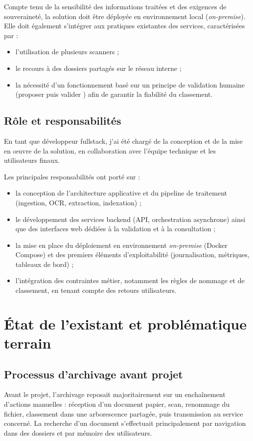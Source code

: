 \documentclass[12pt,a4paper]{report}
\begin{document}
Compte tenu de la sensibilité des informations traitées et des exigences de souveraineté, la solution doit être déployée en environnement local (\textit{on-premise}). Elle doit également s’intégrer aux pratiques existantes des services, caractérisées par :
\begin{itemize}
  \item l’utilisation de plusieurs scanners ;
  \item le recours à des dossiers partagés sur le réseau interne ;
  \item la nécessité d’un fonctionnement basé sur un principe de validation humaine (\og proposer puis valider \fg{}) afin de garantir la fiabilité du classement.
\end{itemize}

\section{Rôle et responsabilités}
En tant que développeur fullstack, j’ai été chargé de la conception et de la mise en œuvre de la solution, en collaboration avec l’équipe technique et les utilisateurs finaux.

Les principales responsabilités ont porté sur :
\begin{itemize}
  \item la conception de l’architecture applicative et du pipeline de traitement (ingestion, OCR, extraction, indexation) ;
  \item le développement des services backend (API, orchestration asynchrone) ainsi que des interfaces web dédiées à la validation et à la consultation ;
  \item la mise en place du déploiement en environnement \textit{on-premise} (Docker Compose) et des premiers éléments d’exploitabilité (journalisation, métriques, tableaux de bord) ;
  \item l’intégration des contraintes métier, notamment les règles de nommage et de classement, en tenant compte des retours utilisateurs.
\end{itemize}

\chapter{État de l’existant et problématique terrain}
\section{Processus d’archivage avant projet}
Avant le projet, l’archivage reposait majoritairement sur un enchaînement d’actions manuelles : réception d’un document papier, scan, renommage du fichier, classement dans une arborescence partagée, puis transmission au service concerné. La recherche d’un document s’effectuait principalement par navigation dans des dossiers et par mémoire des utilisateurs.
\end{document}
